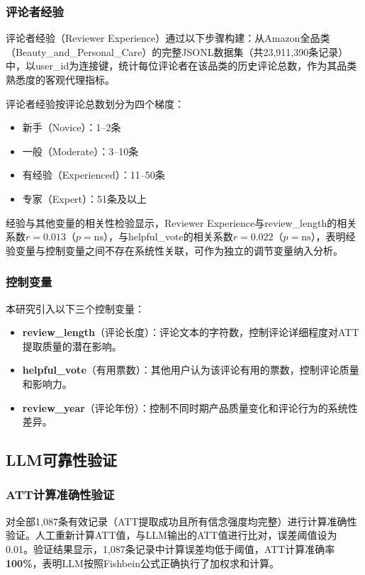 \subsubsection{评论者经验}

评论者经验（Reviewer Experience）通过以下步骤构建：从Amazon全品类（Beauty\_and\_Personal\_Care）的完整JSONL数据集（共23{,}911{,}390条记录）中，以user\_id为连接键，统计每位评论者在该品类的历史评论总数，作为其品类熟悉度的客观代理指标。

评论者经验按评论总数划分为四个梯度：
\begin{itemize}
  \item 新手（Novice）：1--2条
  \item 一般（Moderate）：3--10条
  \item 有经验（Experienced）：11--50条
  \item 专家（Expert）：51条及以上
\end{itemize}

经验与其他变量的相关性检验显示，Reviewer Experience与review\_length的相关系数$r=0.013$（$p=\text{ns}$），与helpful\_vote的相关系数$r=0.022$（$p=\text{ns}$），表明经验变量与控制变量之间不存在系统性关联，可作为独立的调节变量纳入分析。

\subsubsection{控制变量}

本研究引入以下三个控制变量：
\begin{itemize}
  \item \textbf{review\_length}（评论长度）：评论文本的字符数，控制评论详细程度对ATT提取质量的潜在影响。
  \item \textbf{helpful\_vote}（有用票数）：其他用户认为该评论有用的票数，控制评论质量和影响力。
  \item \textbf{review\_year}（评论年份）：控制不同时期产品质量变化和评论行为的系统性差异。
\end{itemize}

\subsection{LLM可靠性验证}

\subsubsection{ATT计算准确性验证}

对全部1{,}087条有效记录（ATT提取成功且所有信念强度均完整）进行计算准确性验证。人工重新计算ATT值，与LLM输出的ATT值进行比对，误差阈值设为0.01。验证结果显示，1{,}087条记录中计算误差均低于阈值，ATT计算准确率\textbf{100\%}，表明LLM按照Fishbein公式正确执行了加权求和计算。

